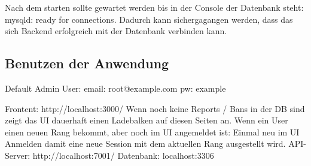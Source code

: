 Nach dem starten sollte gewartet werden bis in der Console der Datenbank steht: mysqld: ready for connections.
Dadurch kann sichergagangen werden, dass das sich Backend erfolgreich mit der Datenbank verbinden kann.

\subsection{Benutzen der Anwendung}

Default Admin User: email: root@example.com pw: example




Frontent: http://localhost:3000/
Wenn noch keine Reports / Bans in der DB sind zeigt das UI dauerhaft einen Ladebalken auf diesen Seiten an.
Wenn ein User einen neuen Rang bekommt, aber noch im UI angemeldet ist: Einmal neu im UI Anmelden damit eine neue Session mit dem aktuellen Rang ausgestellt wird.
\newline
API-Server: http://localhost:7001/
\newline
Datenbank: localhost:3306